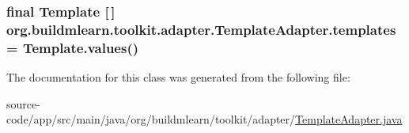 \subsubsection[{\texorpdfstring{templates}{templates}}]{\setlength{\rightskip}{0pt plus 5cm}final {\bf Template} \mbox{[}$\,$\mbox{]} org.\+buildmlearn.\+toolkit.\+adapter.\+Template\+Adapter.\+templates = Template.\+values()\hspace{0.3cm}{\ttfamily [private]}}\hypertarget{classorg_1_1buildmlearn_1_1toolkit_1_1adapter_1_1TemplateAdapter_ae40d5c4f746400bf9406ae5138a4cdcb}{}\label{classorg_1_1buildmlearn_1_1toolkit_1_1adapter_1_1TemplateAdapter_ae40d5c4f746400bf9406ae5138a4cdcb}


The documentation for this class was generated from the following file\+:\begin{DoxyCompactItemize}
\item 
source-\/code/app/src/main/java/org/buildmlearn/toolkit/adapter/\hyperlink{TemplateAdapter_8java}{Template\+Adapter.\+java}\end{DoxyCompactItemize}
